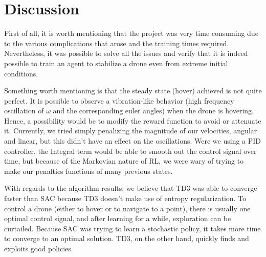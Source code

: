 \section{Discussion}

First of all, it is worth mentioning that the project was very time consuming due to the various 
complications that arose and the training times required. Nevertheless, it was possible to solve
all the issues and verify that it is indeed possible to train an agent to stabilize a drone 
even from extreme initial conditions. 

Something worth mentioning is that the steady state (hover) achieved is not quite perfect. It is possible to 
observe a vibration-like behavior (high frequency oscillation of $\omega$ and the corresponding euler angles) when the drone is hovering.
Hence, a possibility would be to modify the reward function to avoid or attenuate it. Currently, we tried simply
penalizing the magnitude of our velocities, angular and linear, but this didn't have an effect on the oscillations. 
Were we using a PID controller, the Integral term would be able to smooth out the control signal over time, but because of the 
Markovian nature of RL, we were wary of trying to make our penalties functions of many previous states.

With regards to the algorithm results, we believe that TD3 was able to converge faster than SAC because TD3 doesn't make use of entropy regularization. 
To control a drone (either to hover or to navigate to a point), there is usually one optimal control signal, and after learning for a while, exploration can be curtailed. Because SAC was trying to learn a stochastic policy, it takes more time to converge to an optimal solution. TD3, on the other hand, quickly finds and exploits good policies.